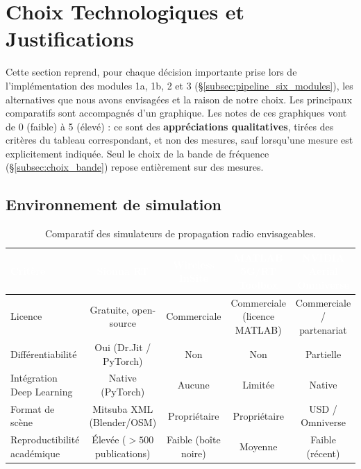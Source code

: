 \documentclass[12pt,a4paper,titlepage]{article}
\newcommand{\hd}[1]{\textcolor{white}{\textbf{#1}}}
\begin{document}
\section{Choix Technologiques et Justifications}
\label{sec:choix_tech}

Cette section reprend, pour chaque décision importante prise lors de l'implémentation des modules 1a, 1b, 2 et 3 (\S\ref{subsec:pipeline_six_modules}), les alternatives que nous avons envisagées et la raison de notre choix. Les principaux comparatifs sont accompagnés d'un graphique. Les notes de ces graphiques vont de 0 (faible) à 5 (élevé) : ce sont des \textbf{appréciations qualitatives}, tirées des critères du tableau correspondant, et non des mesures, sauf lorsqu'une mesure est explicitement indiquée. Seul le choix de la bande de fréquence (\S\ref{subsec:choix_bande}) repose entièrement sur des mesures.

\subsection{Environnement de simulation}
\label{subsec:choix_simulateur}

\begin{table}[H]
    \centering
    \caption{Comparatif des simulateurs de propagation radio envisageables.}
    \begin{tabularx}{\textwidth}{F{3.2cm}CCCC}
        \toprule
        \hd{Critère} & \hd{Sionna RT} & \hd{Wireless InSite} & \hd{MATLAB 5G/RT Toolbox} & \hd{NVIDIA Aerial Omniverse} \\
        \midrule
        Licence & Gratuite, open-source & Commerciale & Commerciale (licence MATLAB) & Commerciale / partenariat \\
        Différentiabilité & Oui (Dr.Jit / PyTorch) & Non & Non & Partielle \\
        Intégration Deep Learning & Native (PyTorch) & Aucune & Limitée & Native \\
        Format de scène & Mitsuba XML (Blender/OSM) & Propriétaire & Propriétaire & USD / Omniverse \\
        Reproductibilité académique & Élevée ($>500$ publications) & Faible (boîte noire) & Moyenne & Faible (récent) \\
        \bottomrule
    \end{tabularx}
\end{table}
\end{document}
